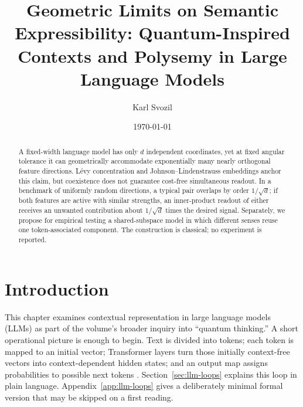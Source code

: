 \documentclass[
  aps,
  reprint,
  superscriptaddress,
  floatfix,
  nofootinbib,
  longbibliography
]{revtex4-2}
\begin{document}
\title{Geometric Limits on Semantic Expressibility: Quantum-Inspired Contexts and Polysemy in Large Language Models}

\author{Karl Svozil}

\date{\today}

\begin{abstract}
A fixed-width language model has only $d$ independent coordinates, yet at fixed
angular tolerance it can geometrically accommodate exponentially many nearly
orthogonal feature directions.  L\'evy concentration and
Johnson--Lindenstrauss embeddings anchor this claim, but coexistence does not
guarantee cost-free simultaneous readout.  In a benchmark of uniformly random
directions, a typical pair overlaps by order $1/\sqrt d$; if both features are
active with similar strengths, an inner-product readout of either receives an
unwanted contribution about $1/\sqrt d$ times the desired signal.  Separately,
we propose for empirical testing a shared-subspace model in which different
senses reuse one token-associated component.  The construction is classical;
no experiment is reported.
\end{abstract}

\maketitle


\section{Introduction}
\label{sec:intro}

This chapter examines contextual representation in large language models
(LLMs) as part of the volume's broader inquiry into ``quantum thinking.''  A
short operational picture is enough to begin.  Text is divided into tokens;
each token is mapped to an initial vector; Transformer layers turn those
initially context-free vectors into context-dependent hidden states; and an
output map assigns probabilities to possible next tokens
\cite{Vaswani-2017-Attention}.  Section~\ref{sec:llm-loops} explains this loop
in plain language.  Appendix~\ref{app:llm-loops} gives a deliberately minimal
formal version that may be skipped on a first reading.
\end{document}
